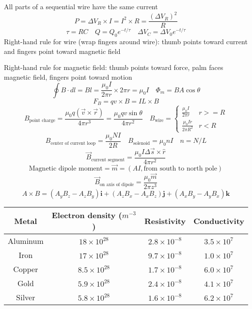 \documentclass[8pt,twocolumn]{extarticle}
\begin{document}
All parts of a sequential wire have the same current
\[P=\Delta V_R\times I = I^2 \times R = \frac{{(\Delta V_R)}^2}{R}\]
\[\tau = RC\quad Q=Q_0 e^{-t/\tau}\quad \Delta V_C = \Delta V_0 e^{-t/\tau}\]
Right-hand rule for wire (wrap fingers around wire): thumb points toward current and fingers point toward magnetic field
\vspace{1em}

Right-hand rule for magnetic field: thumb points toward force, palm faces magnetic field, fingers point toward motion
\[\oint B\cdot dl=Bl=\frac{\mu_0 I}{2\pi r}\times 2 \pi r=\mu_0 I\quad \Phi_m = BA\cos\theta\]
\[F_B = qv\times B = IL\times B\]
\[B_\text{point charge} = \frac{\mu_0 q (\vec{v}\times\vec{r})}{4\pi r^3} = \frac{\mu_0 qv\sin\theta}{4\pi r^2}\quad B_\text{wire} = \begin{cases}
    \frac{\mu_0 I}{2\pi r} & r >= R \\
    \frac{\mu_0 I r}{2\pi R^2} & r < R
\end{cases}\]
\[B_\text{center of current loop}=\frac{\mu_0 N I}{2R}\quad B_\text{solenoid}=\mu_0 n I\quad n=N/L\]
\[\vec{B}_\text{current segment}=\frac{\mu_0 I \Delta \vec{s}\times \hat{r}}{4\pi r^2}\]
\[\text{Magnetic dipole moment}=\vec{m}=(AI, \text{from south to north pole})\]
\[\vec{B}_\text{on axis of dipole}=\frac{\mu_0 \vec{m}}{2\pi z^3}\]
\[A\times B=(A_y B_z - A_z B_y)\mathbf{i} + (A_z B_x - A_x B_z)\mathbf{j} + (A_x B_y - A_y B_x)\mathbf{k}\]

\begin{center}
    \begin{tabular}{|c c c c|} 
        \hline
        Metal & Electron density ($m^{-3}$) & Resistivity & Conductivity \\ [0.5ex]
        \hline
        Aluminum & $18\times 10^{28}$ & $2.8\times 10^{-8}$ & $3.5\times 10^7$ \\
        \hline
        Iron & $17\times 10^{28}$ & $9.7\times 10^{-8}$ & $1.0\times 10^7$ \\
        \hline
        Copper & $8.5\times 10^{28}$ & $1.7 \times 10^{-8}$ & $6.0\times 10^7$ \\
        \hline
        Gold & $5.9\times 10^{28}$ & $2.4\times 10^{-8}$ & $4.1\times 10^7$ \\
        \hline
        Silver & $5.8\times 10^{28}$ & $1.6\times 10^{-8}$ & $6.2\times 10^7$ \\
        \hline
    \end{tabular}
\end{center}
\end{document}
